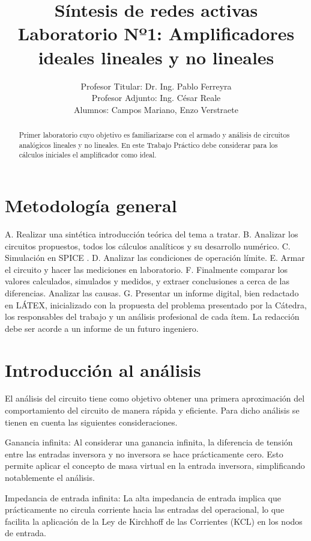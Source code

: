 \documentclass[12pt]{article}
\title{Síntesis de redes activas \\ Laboratorio Nº1: Amplificadores ideales lineales y no lineales}
\author{Profesor Titular: Dr. Ing. Pablo Ferreyra \\  Profesor Adjunto: Ing. César Reale \\ Alumnos: Campos Mariano, 
		Enzo Verstraete}
\begin{document}
	\maketitle
	
	\begin{abstract}
		Primer laboratorio cuyo objetivo es familiarizarse con el armado y análisis de circuitos analógicos
		lineales y no lineales. En este Trabajo Práctico debe considerar para los cálculos iniciales el 
		amplificador como ideal.
	\end{abstract}
	
	
	\section{Metodología general}	
		A. Realizar una sintética introducción teórica del tema a tratar.
		B. Analizar los circuitos propuestos, todos los cálculos analíticos y su desarrollo numérico.
		C. Simulación en SPICE .
		D. Analizar las condiciones de operación límite.
		E. Armar el circuito y hacer las mediciones en laboratorio.
		F. Finalmente comparar los valores calculados, simulados y medidos, y extraer conclusiones a
		cerca de las diferencias. Analizar las causas.
		G. Presentar un informe digital, bien redactado en LÁTEX, inicializado con la propuesta del
		problema presentado por la Cátedra, los responsables del trabajo y un análisis profesional de
		cada ítem. La redacción debe ser acorde a un informe de un futuro ingeniero.
	
	\section{Introducción al análisis}
	
	El análisis del	circuito tiene como objetivo obtener una primera aproximación del comportamiento
	del circuito de manera rápida y eficiente. Para dicho análisis se tienen en cuenta las siguientes
	consideraciones.
	
	Ganancia infinita: Al considerar una ganancia infinita, la diferencia de tensión entre las entradas inversora y no inversora se hace prácticamente cero. Esto permite aplicar el concepto de masa virtual en la entrada inversora, simplificando notablemente el análisis.
	
	Impedancia de entrada infinita: La alta impedancia de entrada implica que prácticamente no circula corriente hacia las entradas del operacional, lo que facilita la aplicación de la Ley de Kirchhoff de las Corrientes (KCL) en los nodos de entrada.
	
\end{document}
